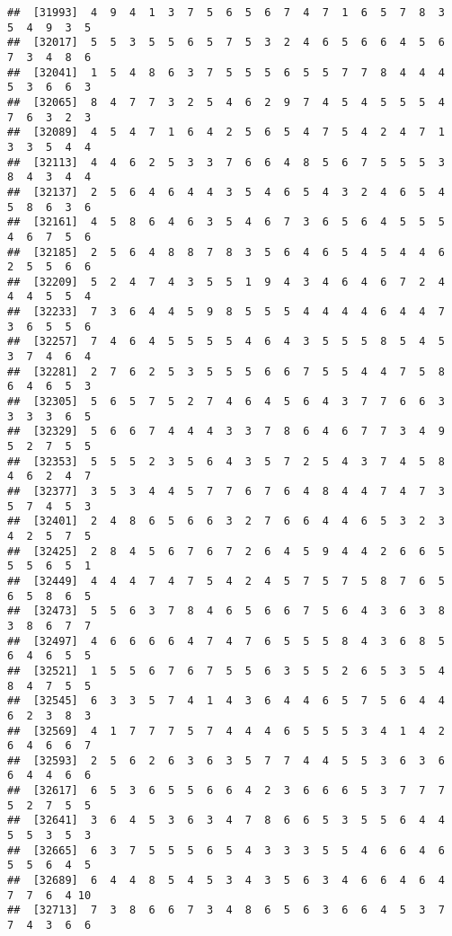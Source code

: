 \documentclass[
]{book}
\begin{document}
\begin{verbatim}
##  [31993]  4  9  4  1  3  7  5  6  5  6  7  4  7  1  6  5  7  8  3  5  4  9  3  5
##  [32017]  5  5  3  5  5  6  5  7  5  3  2  4  6  5  6  6  4  5  6  7  3  4  8  6
##  [32041]  1  5  4  8  6  3  7  5  5  5  6  5  5  7  7  8  4  4  4  5  3  6  6  3
##  [32065]  8  4  7  7  3  2  5  4  6  2  9  7  4  5  4  5  5  5  4  7  6  3  2  3
##  [32089]  4  5  4  7  1  6  4  2  5  6  5  4  7  5  4  2  4  7  1  3  3  5  4  4
##  [32113]  4  4  6  2  5  3  3  7  6  6  4  8  5  6  7  5  5  5  3  8  4  3  4  4
##  [32137]  2  5  6  4  6  4  4  3  5  4  6  5  4  3  2  4  6  5  4  5  8  6  3  6
##  [32161]  4  5  8  6  4  6  3  5  4  6  7  3  6  5  6  4  5  5  5  4  6  7  5  6
##  [32185]  2  5  6  4  8  8  7  8  3  5  6  4  6  5  4  5  4  4  6  2  5  5  6  6
##  [32209]  5  2  4  7  4  3  5  5  1  9  4  3  4  6  4  6  7  2  4  4  4  5  5  4
##  [32233]  7  3  6  4  4  5  9  8  5  5  5  4  4  4  4  6  4  4  7  3  6  5  5  6
##  [32257]  7  4  6  4  5  5  5  5  4  6  4  3  5  5  5  8  5  4  5  3  7  4  6  4
##  [32281]  2  7  6  2  5  3  5  5  5  6  6  7  5  5  4  4  7  5  8  6  4  6  5  3
##  [32305]  5  6  5  7  5  2  7  4  6  4  5  6  4  3  7  7  6  6  3  3  3  3  6  5
##  [32329]  5  6  6  7  4  4  4  3  3  7  8  6  4  6  7  7  3  4  9  5  2  7  5  5
##  [32353]  5  5  5  2  3  5  6  4  3  5  7  2  5  4  3  7  4  5  8  4  6  2  4  7
##  [32377]  3  5  3  4  4  5  7  7  6  7  6  4  8  4  4  7  4  7  3  5  7  4  5  3
##  [32401]  2  4  8  6  5  6  6  3  2  7  6  6  4  4  6  5  3  2  3  4  2  5  7  5
##  [32425]  2  8  4  5  6  7  6  7  2  6  4  5  9  4  4  2  6  6  5  5  5  6  5  1
##  [32449]  4  4  4  7  4  7  5  4  2  4  5  7  5  7  5  8  7  6  5  6  5  8  6  5
##  [32473]  5  5  6  3  7  8  4  6  5  6  6  7  5  6  4  3  6  3  8  3  8  6  7  7
##  [32497]  4  6  6  6  6  4  7  4  7  6  5  5  5  8  4  3  6  8  5  6  4  6  5  5
##  [32521]  1  5  5  6  7  6  7  5  5  6  3  5  5  2  6  5  3  5  4  8  4  7  5  5
##  [32545]  6  3  3  5  7  4  1  4  3  6  4  4  6  5  7  5  6  4  4  6  2  3  8  3
##  [32569]  4  1  7  7  7  5  7  4  4  4  6  5  5  5  3  4  1  4  2  6  4  6  6  7
##  [32593]  2  5  6  2  6  3  6  3  5  7  7  4  4  5  5  3  6  3  6  6  4  4  6  6
##  [32617]  6  5  3  6  5  5  6  6  4  2  3  6  6  6  5  3  7  7  7  5  2  7  5  5
##  [32641]  3  6  4  5  3  6  3  4  7  8  6  6  5  3  5  5  6  4  4  5  5  3  5  3
##  [32665]  6  3  7  5  5  5  6  5  4  3  3  3  5  5  4  6  6  4  6  5  5  6  4  5
##  [32689]  6  4  4  8  5  4  5  3  4  3  5  6  3  4  6  6  4  6  4  7  7  6  4 10
##  [32713]  7  3  8  6  6  7  3  4  8  6  5  6  3  6  6  4  5  3  7  7  4  3  6  6

\end{verbatim}
\end{document}
